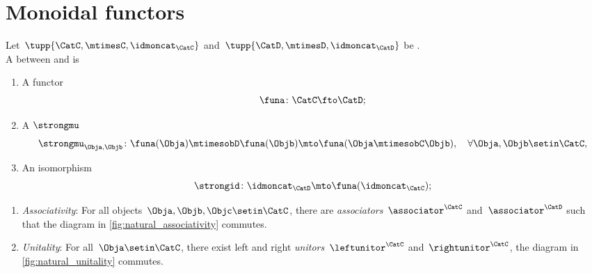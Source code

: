 
\section{Monoidal functors}
\label{sec:monoidal-functors}
\begin{ctdefinition}
    \label{def:strong-monoidal-functor}
    Let~$\tupp{\CatC,\mtimesC,\idmoncat_{\CatC}}$ and~$\tupp{\CatD,{{\mtimesD}},\idmoncat_{\CatD}}$ be .
    \\
    A  between \CatC and \CatD is

    \constit
    \begin{enumerate}
        \item A functor
              \begin{equation}
                  \funa \colon \CatC \fto \CatD;
              \end{equation}
        \item A  $\strongmu$ \label{def:strongmu}
              \begin{equation}
                  \strongmu_{\Obja,\Objb}\colon \funa(\Obja)\mtimesobD \funa(\Objb) \mto \funa(\Obja \mtimesobC \Objb),\quad \forall \Obja,\Objb\setin \CatC,
              \end{equation}
        \item An isomorphism \label{def:strongeps}
              \begin{equation}
                  \strongid \colon \idmoncat_{\CatD}\mto \funa(\idmoncat_{\CatC});
              \end{equation}

    \end{enumerate}

    \condit
    \begin{enumerate}
        \item \emph{Associativity}: For all objects~$\Obja,\Objb,\Objc\setin \CatC$, there are  \emph{associators}~$\associator^\CatC$ and~$\associator^\CatD$ such that the diagram in \cref{fig:natural_associativity} commutes.
        \item \emph{Unitality}: For all~$\Obja\setin \CatC$, there exist left and right \emph{unitors}~$\leftunitor^\CatC$ and~$\rightunitor^\CatC$, the diagram in
              \cref{fig:natural_unitality} commutes.
    \end{enumerate}
\end{ctdefinition}
